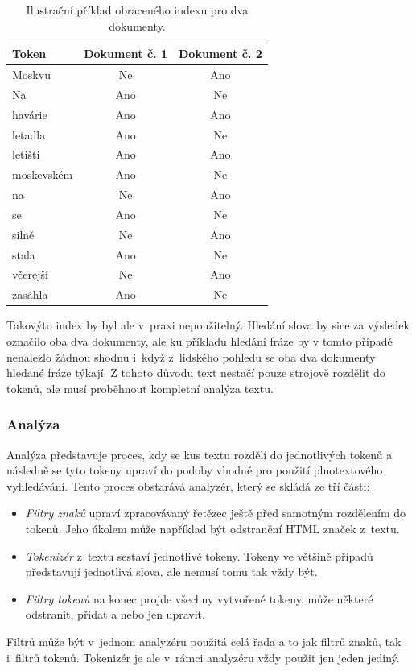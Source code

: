 \begin{table}[h!]
\centering
\begin{tabular}{ |l|c|c| } 
\hline
Token & Dokument č. 1 & Dokument č. 2 \\
\hline
Moskvu & Ne & Ano \\
Na & Ano & Ne \\
havárie & Ano & Ano \\
letadla & Ano & Ne \\
letišti & Ano & Ano \\
moskevském & Ano & Ne \\
na & Ne & Ano \\
se & Ano & Ne \\
silně & Ne & Ano \\
stala & Ano & Ne \\
včerejší & Ne & Ano \\
zasáhla & Ano & Ne \\
\hline
\end{tabular}
\caption{Ilustrační příklad obraceného indexu pro dva dokumenty.}
\end{table}

Takovýto index by byl ale v~praxi nepoužitelný. Hledání slova  by sice za výsledek označilo oba dva dokumenty, ale ku příkladu hledání fráze  by v tomto případě nenalezlo žádnou shodnu i~když z~lidského pohledu se oba dva dokumenty hledané fráze týkají. Z tohoto důvodu text nestačí pouze strojově rozdělit do tokenů, ale musí proběhnout kompletní analýza textu.

\subsubsection*{Analýza}
Analýza představuje proces, kdy se kus textu rozdělí do jednotlivých tokenů a následně se tyto tokeny upraví do podoby vhodné pro použití plnotextového vyhledávání. Tento proces obstarává analyzér, který se skládá ze tří části:
\begin{itemize}
    \item \emph{Filtry znaků} upraví zpracovávaný řetězec ještě před samotným rozdělením do tokenů. Jeho úkolem může například být odstranění HTML značek z~textu.
    \item \emph{Tokenizér} z~textu sestaví jednotlivé tokeny. Tokeny ve většině případů představují jednotlivá slova, ale nemusí tomu tak vždy být. 
    \item \emph{Filtry tokenů} na konec projde všechny vytvořené tokeny, může některé odstranit, přidat a nebo jen upravit. 
\end{itemize}
Filtrů může být v~jednom analyzéru použitá celá řada a to jak filtrů znaků, tak i~filtrů tokenů. Tokenizér je ale v~rámci analyzéru vždy použit jen jeden jediný.

